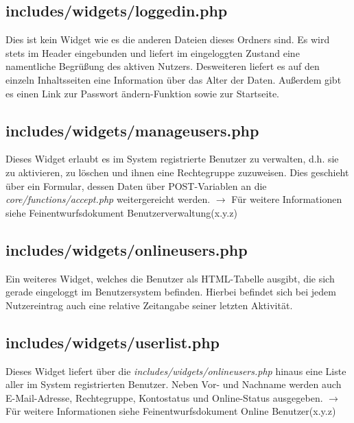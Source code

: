 \documentclass[fontsize = 12pt, paper = a4]{scrreprt}
\begin{document}
\subsection{includes/widgets/loggedin.php}
Dies ist kein Widget wie es die anderen Dateien dieses Ordners sind. Es wird stets im Header eingebunden und liefert im eingeloggten Zustand eine namentliche Begrüßung des aktiven Nutzers. Desweiteren liefert es auf den einzeln Inhaltsseiten eine Information über das Alter der Daten. Außerdem gibt es einen Link zur \glqq Passwort ändern\grqq-Funktion sowie zur Startseite.

\subsection{includes/widgets/manageusers.php}
Dieses Widget erlaubt es im System registrierte Benutzer zu verwalten, d.h. sie zu aktivieren, zu löschen und ihnen eine Rechtegruppe zuzuweisen. Dies geschieht über ein Formular, dessen Daten über POST-Variablen an die \textit{core/functions/accept.php} weitergereicht werden.
$\rightarrow$ Für weitere Informationen siehe Feinentwurfsdokument \glqq Benutzerverwaltung\grqq (x.y.z)

\subsection{includes/widgets/onlineusers.php}
Ein weiteres Widget, welches die Benutzer als HTML-Tabelle ausgibt, die sich gerade eingeloggt im Benutzersystem befinden. Hierbei befindet sich bei jedem Nutzereintrag auch eine relative Zeitangabe seiner letzten Aktivität.

\subsection{includes/widgets/userlist.php}
Dieses Widget liefert über die \textit{includes/widgets/onlineusers.php} hinaus eine Liste aller im System registrierten Benutzer. Neben Vor- und Nachname werden auch E-Mail-Adresse, Rechtegruppe, Kontostatus und Online-Status ausgegeben.
$\rightarrow$ Für weitere Informationen siehe Feinentwurfsdokument \glqq Online Benutzer\grqq (x.y.z)



  









\end{document}

